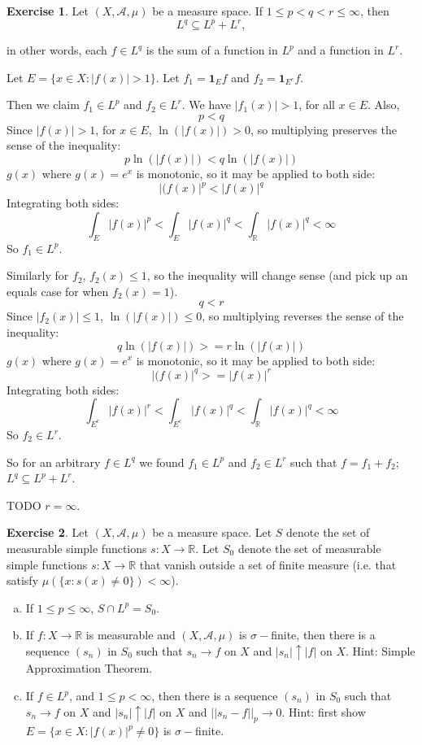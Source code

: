 \documentclass[11pt,oneside]{article}
\numberwithin{equation}{section}
\theoremstyle{definition}
\newtheorem{exercise}{Exercise}
\def\RR{\mathbb{R}}
\def\fancyA{\mathscr{A}}
\def\one{\mathbf{1}}
\begin{document}
\begin{exercise}
  Let $(X, \fancyA, \mu) $ be a measure space.  If $1 \leq p < q < r \leq \infty$, then
  \[
  L^q \subseteq L^p + L^r,
  \]

  in other words, each $f \in L^q$ is the sum of a function in $L^p$ and a function in $L^r$. 
\end{exercise}
\begin{solution}
  Let $E = \{ x \in X : | f(x) | > 1 \}$.  Let $f_1 = \one_E f$ and $f_2 = \one_{E^c} f$.

  Then we claim $f_1 \in L^p$ and $f_2 \in L^r$.  We have $|f_1(x)| > 1$, for all $x \in E$.  Also, 
  \[
  p < q
  \]
  Since $|f(x)| > 1$, for $x \in E$, $\ln (|f(x)|) > 0$, so multiplying preserves the sense of the inequality:
  \[
  p \ln (|f(x)|) < q \ln (|f(x)|)
  \]
  $g(x)$ where $g(x) = e^x$ is monotonic, so it may be applied to both side:
  \[
  |(f(x)|^p < |f(x)|^q
  \]
  Integrating both sides:
  \[
  \int_E |f(x)|^p < \int_E |f(x)|^q < \int_\RR |f(x)|^q < \infty
  \]
  So $f_1 \in L^p$.

  Similarly for $f_2$, $f_2(x) \leq 1$, so the inequality will change sense (and pick up
  an equals case for when $f_2(x) = 1$).  
  \[
  q < r
  \]
  Since $|f_2(x)| \leq 1$, $\ln (|f(x)|) \leq 0$, so multiplying reverses the sense of the inequality:
  \[
  q \ln (|f(x)|) >= r \ln (|f(x)|)
  \]
  $g(x)$ where $g(x) = e^x$ is monotonic, so it may be applied to both side:
  \[
  |(f(x)|^q >= |f(x)|^r
  \]
  Integrating both sides:
  \[
  \int_{E^c} |f(x)|^r < \int_{E^c} |f(x)|^q < \int_\RR |f(x)|^q < \infty
  \]
  So $f_2 \in L^r$.

  So for an arbitrary $f \in L^q$ we found $f_1 \in L^p$ and $f_2 \in L^r$ such that $f = f_1 + f_2$; $L^q \subseteq L^p + L^r$.

  TODO $r = \infty$.  
  
  
\end{solution}

\begin{exercise}
  Let $(X, \fancyA, \mu )$ be a measure space.  Let $S$ denote the set of measurable simple functions $s : X \to \RR$.  Let
  $S_0$ denote the set of measurable simple functions $s : X \to \RR$ that vanish outside a set of
  finite measure (i.e. that satisfy $\mu (\{ x: s(x) \neq 0\}) < \infty$).  
\begin{enumerate}[(a)]
\item
  If $1 \leq p \leq \infty$, $S \cap L^p = S_0$.
\item
  If $f : X \to \RR$ is measurable and $(X, \fancyA, \mu)$ is
  $\sigma-$finite, then there is a sequence $(s_n)$ in $S_0$ such that
  $s_n \to f$ on $X$ and $|s_n|\uparrow |f|$ on $X$.  Hint: Simple Approximation Theorem.
\item
  If $f \in L^p$, and $1 \leq p < \infty$, then there is a sequence $(s_n)$ in $S_0$ such that
  $s_n \to f$ on $X$ and $ |s_n| \uparrow |f|$ on $X$ and $|| s_n - f||_p \to 0$. Hint:
  first show $E = \{ x \in X: | f(x)| ^p \neq 0 \}$ is $\sigma-$finite.  
\end{enumerate}
  
\end{exercise}
\end{document}

